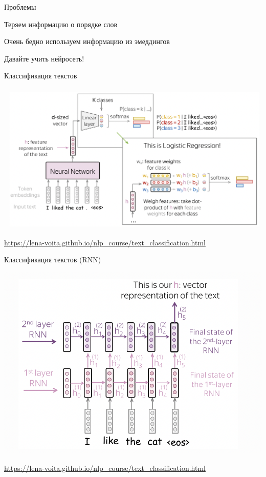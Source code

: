 \documentclass[notes,12pt, aspectratio=169]{beamer}
\newenvironment{wideitemize}{\itemize\addtolength{\itemsep}{10pt}}{\enditemize}
\begin{document}
\begin{frame}{Проблемы}
	\begin{wideitemize} 
		\item  Теряем информацию о порядке слов 
		\item  Очень бедно используем информацию из эмеддингов
		\item  \alert{Давайте учить нейросеть!}
	\end{wideitemize} 
\end{frame} 


\begin{frame}{Классификация текстов}
	\begin{center}
		\includegraphics[width=.85\linewidth]{clf_pipe.png}
	\end{center}
	
	\vfill
	\footnotesize  {\color{blue} \url{https://lena-voita.github.io/nlp_course/text_classification.html}} 
\end{frame} 


\begin{frame}{Классификация текстов (RNN)}
	\begin{center}
		\includegraphics[width=.65\linewidth]{rnn_clf.png}
	\end{center}
	
	\vfill
	\footnotesize  {\color{blue} \url{https://lena-voita.github.io/nlp_course/text_classification.html}} 
\end{frame} 
\end{document}
